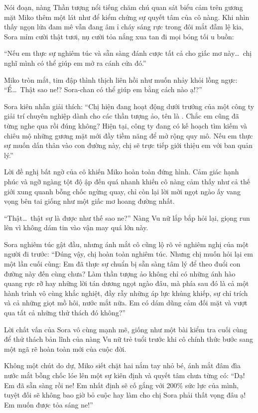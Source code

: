 \documentclass[../main.tex]{subfiles}
\begin{document}
Nói đoạn, nàng Thần tượng nổi tiếng chăm chú quan sát biểu cảm trên gương mặt Miko thêm một lát như để kiểm chứng sự quyết tâm của cô nàng. Khi nhìn thấy ngọn lửa đam mê vẫn đang âm ỉ cháy sáng rực trong đôi mắt đẫm lệ kia, Sora mỉm cười thật tươi, nụ cười tỏa nắng xua tan đi mọi bóng tối u buồn:

``Nếu em thực sự nghiêm túc và sẵn sàng đánh cược tất cả cho giấc mơ này\dots\ chị nghĩ mình có thể giúp em mở ra cánh cửa đó.''

Miko tròn mắt, tim đập thình thịch liên hồi như muốn nhảy khỏi lồng ngực: ``Ể\dots\ Thật sao ne!? Sora-chan có thể giúp em bằng cách nào ạ!?''

Sora kiên nhẫn giải thích: ``Chị hiện đang hoạt động dưới trướng của một công ty giải trí chuyên nghiệp dành cho các thần tượng ảo, tên là \hll. Chắc em cũng đã từng nghe qua rồi đúng không? Hiện tại, công ty đang có kế hoạch tìm kiếm và chiêu mộ những gương mặt mới đầy tiềm năng để mở rộng quy mô. Nếu em thực sự muốn dấn thân vào con đường này, chị sẽ trực tiếp giới thiệu em với ban quản lý.''

Lời đề nghị bất ngờ của cô khiến Miko hoàn toàn đứng hình. Cảm giác hạnh phúc và ngỡ ngàng tột độ ập đến quá nhanh khiến cô nàng cảm thấy như cả thế giới xung quanh bỗng chốc ngừng quay, chỉ còn lại lời mời ngọt ngào ấy vang vọng bên tai giống như một giấc mơ hoang đường nhất.

``Thật\dots\ thật sự là được như thế sao ne?'' Nàng Vu nữ lắp bắp hỏi lại, giọng run lên vì không dám tin vào vận may quá lớn này.

Sora nghiêm túc gật đầu, nhưng ánh mắt cô cũng lộ rõ vẻ nghiêm nghị của một người đi trước: ``Đúng vậy, chị hoàn toàn nghiêm túc. Nhưng chị muốn hỏi lại em một lần cuối cùng: Em đã thực sự chuẩn bị sẵn sàng tâm lý để theo đuổi con đường này đến cùng chưa? Làm thần tượng ảo không chỉ có những ánh hào quang rực rỡ hay những lời tán dương ngọt ngào đâu, mà phía sau đó là cả một hành trình vô cùng khắc nghiệt, đầy rẫy những áp lực khủng khiếp, sự chỉ trích và cả những giọt mồ hôi, nước mắt nữa. Em có dám dũng cảm đối mặt và vượt qua tất cả những thử thách đó không?''

Lời chất vấn của Sora vô cùng mạnh mẽ, giống như một bài kiểm tra cuối cùng để thử thách bản lĩnh của nàng Vu nữ trẻ tuổi trước khi cô chính thức bước sang một ngã rẽ hoàn toàn mới của cuộc đời.

Không một chút do dự, Miko siết chặt hai nắm tay nhỏ bé, ánh mắt đâm đìa nước mắt bỗng chốc lóe lên một sự kiên định và quyết tâm chưa từng có: ``Dạ! Em đã sẵn sàng rồi ne! Em nhất định sẽ cố gắng với 200\% sức lực của mình, tuyệt đối sẽ không bao giờ bỏ cuộc hay làm cho chị Sora phải thất vọng đâu ạ! Em muốn được tỏa sáng ne!''
\end{document}
